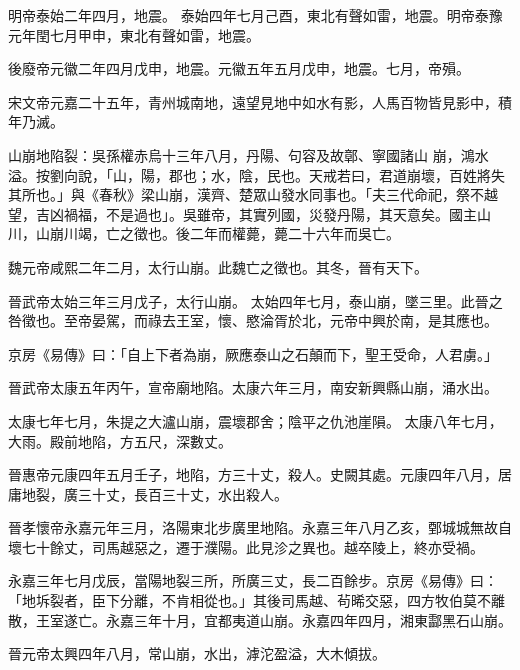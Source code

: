 \begin{pinyinscope}
 明帝泰始二年四月，地震。
 泰始四年七月己酉，東北有聲如雷，地震。明帝泰豫元年閏七月甲申，東北有聲如雷，地震。



 後廢帝元徽二年四月戊申，地震。元徽五年五月戊申，地震。七月，帝殞。



 宋文帝元嘉二十五年，青州城南地，遠望見地中如水有影，人馬百物皆見影中，積年乃滅。



 山崩地陷裂：吳孫權赤烏十三年八月，丹陽、句容及故鄣、寧國諸山
 崩，鴻水溢。按劉向說，「山，陽，郡也；水，陰，民也。天戒若曰，君道崩壞，百姓將失其所也。」與《春秋》梁山崩，漢齊、楚眾山發水同事也。「夫三代命祀，祭不越望，吉凶禍福，不是過也」。吳雖帝，其實列國，災發丹陽，其天意矣。國主山川，山崩川竭，亡之徵也。後二年而權薨，薨二十六年而吳亡。



 魏元帝咸熙二年二月，太行山崩。此魏亡之徵也。其冬，晉有天下。



 晉武帝太始三年三月戊子，太行山崩。
 太始四年七月，泰山崩，墜三里。此晉之咎徵也。至帝晏駕，而祿去王室，懷、愍淪胥於北，元帝中興於南，是其應也。



 京房《易傳》曰：「自上下者為崩，厥應泰山之石顛而下，聖王受命，人君虜。」



 晉武帝太康五年丙午，宣帝廟地陷。太康六年三月，南安新興縣山崩，涌水出。



 太康七年七月，朱提之大瀘山崩，震壞郡舍；陰平之仇池崖隕。
 太康八年七月，大雨。殿前地陷，方五尺，深數丈。



 晉惠帝元康四年五月壬子，地陷，方三十丈，殺人。史闕其處。元康四年八月，居庸地裂，廣三十丈，長百三十丈，水出殺人。



 晉孝懷帝永嘉元年三月，洛陽東北步廣里地陷。永嘉三年八月乙亥，鄄城城無故自壞七十餘丈，司馬越惡之，遷于濮陽。此見沴之異也。越卒陵上，終亦受禍。



 永嘉三年七月戊辰，當陽地裂三所，所廣三丈，長二百餘步。京房《易傳》曰：「地坼裂者，臣下分離，不肯相從也。」其後司馬越、茍晞交惡，四方牧伯莫不離散，王室遂亡。永嘉三年十月，宜都夷道山崩。永嘉四年四月，湘東酃黑石山崩。



 晉元帝太興四年八月，常山崩，水出，滹沱盈溢，大木傾拔。




\end{pinyinscope}
